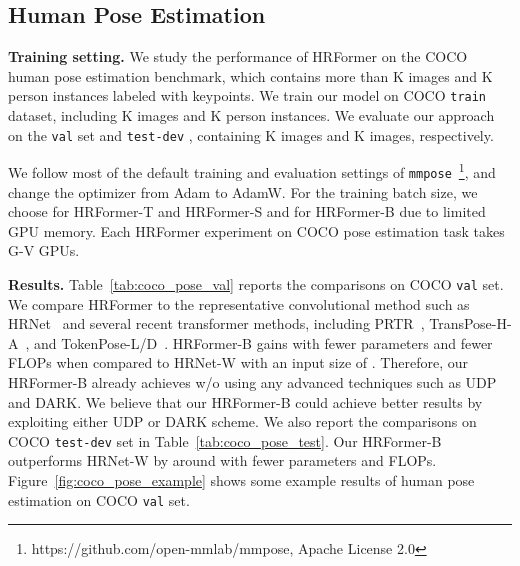 \documentclass{article}
\begin{document}
\subsection{Human Pose Estimation}
\noindent\textbf{Training setting.}
We study the performance of HRFormer
on the COCO~\cite{lin2014microsoft} human pose estimation benchmark,
which contains more than
K images and K person instances labeled with  keypoints.
We train our model on COCO \texttt{train}  dataset, including K images
and K person instances.
We evaluate our approach on the \texttt{val}  set and \texttt{test-dev} ,
containing K images and K images, respectively.

We follow most of the default training and evaluation settings
of \texttt{mmpose}~\cite{mmpose2020}\footnote{https://github.com/open-mmlab/mmpose, Apache License 2.0},
and change the optimizer from Adam to AdamW.
For the training batch size, we choose  for HRFormer-T and HRFormer-S
and  for HRFormer-B due to limited GPU memory.
Each HRFormer experiment on COCO pose estimation task takes  G-V GPUs.


\noindent\textbf{Results.}
Table~\ref{tab:coco_pose_val} reports the comparisons on COCO \texttt{val} set.
We compare HRFormer to the representative convolutional method such as HRNet~\cite{XLW19}
and several recent transformer methods, including PRTR~\cite{li2021pose}, TransPose-H-A~\cite{yang2020transpose},
and TokenPose-L/D~\cite{li2021tokenpose}.
HRFormer-B gains 
with  fewer parameters and  fewer FLOPs when compared to HRNet-W
with an input size of .
Therefore,
our HRFormer-B already achieves  w/o using any advanced techniques
such as UDP~\cite{Huang2020CVPR} and DARK\cite{zhang2020distribution}. We believe that our HRFormer-B could achieve better results by exploiting either UDP or DARK scheme.
We also report the comparisons on COCO \texttt{test-dev} set in Table~\ref{tab:coco_pose_test}.
Our HRFormer-B outperforms HRNet-W by around 
with fewer parameters and FLOPs.
Figure~\ref{fig:coco_pose_example} shows some example results
of human pose estimation on COCO \texttt{val} set.
\end{document}
